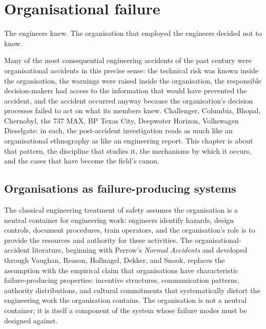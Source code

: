 \chapter{Organisational failure}
\label{vol10:ch10}

\epigraph{The engineers knew. The organisation that employed the engineers decided not to know.}{}


\noindent
Many of the most consequential engineering accidents of the past century were organisational accidents in this precise sense: the technical risk was known inside the organisation, the warnings were raised inside the organisation, the responsible decision-makers had access to the information that would have prevented the accident, and the accident occurred anyway because the organisation's decision processes failed to act on what its members knew. Challenger, Columbia, Bhopal, Chernobyl, the 737 MAX, BP Texas City, Deepwater Horizon, Volkswagen Dieselgate: in each, the post-accident investigation reads as much like an organisational ethnography as like an engineering report. This chapter is about that pattern, the discipline that studies it, the mechanisms by which it occurs, and the cases that have become the field's canon.

\section{Organisations as failure-producing systems}

The classical engineering treatment of safety assumes the organisation is a neutral container for engineering work: engineers identify hazards, design controls, document procedures, train operators, and the organisation's role is to provide the resources and authority for these activities. The organisational-accident literature, beginning with Perrow's \emph{Normal Accidents} \cite{gen:perrow1984} and developed through Vaughan, Reason, Hollnagel, Dekker, and Snook, replaces the assumption with the empirical claim that organisations have characteristic failure-producing properties: incentive structures, communication patterns, authority distributions, and cultural commitments that systematically distort the engineering work the organisation contains. The organisation is not a neutral container; it is itself a component of the system whose failure modes must be designed against.

